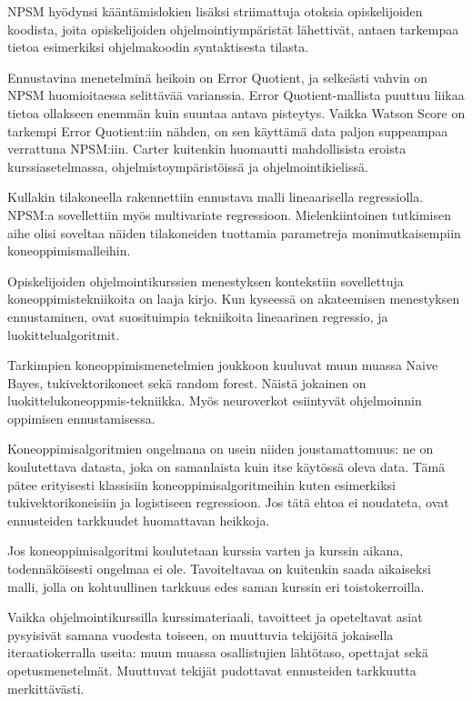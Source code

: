 \documentclass[finnish,twoside,openright]{HYgraduMLDS}
\begin{document}
NPSM hyödynsi kääntämislokien lisäksi striimattuja otoksia opiskelijoiden koodista, joita opiskelijoiden ohjelmointiympäristät lähettivät, antaen tarkempaa tietoa esimerkiksi ohjelmakoodin syntaktisesta tilasta. 

Ennustavina menetelminä heikoin on Error Quotient, ja selkeästi vahvin on NPSM huomioitaessa selittävää varianssia\cite{carter2015normalized}. Error Quotient-mallista puuttuu liikaa tietoa ollakseen enemmän kuin suuntaa antava pisteytys\cite{jadud2006methods}. Vaikka Watson Score on tarkempi Error Quotient:iin nähden, on sen käyttämä data paljon suppeampaa verrattuna NPSM:iin\cite{carter2015normalized}. Carter kuitenkin huomautti mahdollisista eroista kurssiasetelmassa, ohjelmistoympäristöissä ja ohjelmointikielissä\cite{carter2015normalized}. 

Kullakin tilakoneella rakennettiin ennustava malli lineaarisella regressiolla. NPSM:a sovellettiin myös multivariate regressioon. Mielenkiintoinen tutkimisen aihe olisi soveltaa näiden tilakoneiden tuottamia parametreja monimutkaisempiin koneoppimismalleihin.

Opiskelijoiden ohjelmointikurssien menestyksen kontekstiin sovellettuja koneoppimistekniikoita on laaja kirjo. Kun kyseessä on akateemisen menestyksen ennustaminen, ovat suosituimpia tekniikoita lineaarinen regressio, ja luokittelualgoritmit\cite{hellas2018predicting}. 

Tarkimpien koneoppimismenetelmien joukkoon kuuluvat muun muassa Naive Bayes\cite{bergin2015using}, tukivektorikoneet\cite{bergin2015using} sekä random forest\cite{lagus2018transfer}. Näistä jokainen on luokittelukoneoppmis-tekniikka. Myös neuroverkot esiintyvät ohjelmoinnin oppimisen ennustamisessa\cite{Castro-Wunsch:2017:ENN:3017680.3017792}. 

Koneoppimisalgoritmien ongelmana on usein niiden joustamattomuus: ne on koulutettava datasta, joka on samanlaista kuin itse käytössä oleva data. Tämä pätee erityisesti klassisiin koneoppimisalgoritmeihin kuten esimerkiksi tukivektorikoneisiin ja logistiseen regressioon. Jos tätä ehtoa ei noudateta, ovat ennusteiden tarkkuudet huomattavan heikkoja. 

Jos koneoppimisalgoritmi koulutetaan kurssia varten ja kurssin aikana, todennäköisesti ongelmaa ei ole. Tavoiteltavaa on kuitenkin saada aikaiseksi malli, jolla on kohtuullinen tarkkuus edes saman kurssin eri toistokerroilla. 

Vaikka ohjelmointikurssilla kurssimateriaali, tavoitteet ja opeteltavat asiat pysyisivät samana vuodesta toiseen, on muuttuvia tekijöitä jokaisella iteraatiokerralla useita: muun muassa osallistujien lähtötaso, opettajat sekä opetusmenetelmät. Muuttuvat tekijät pudottavat ennusteiden tarkkuutta merkittävästi. 
\end{document}
